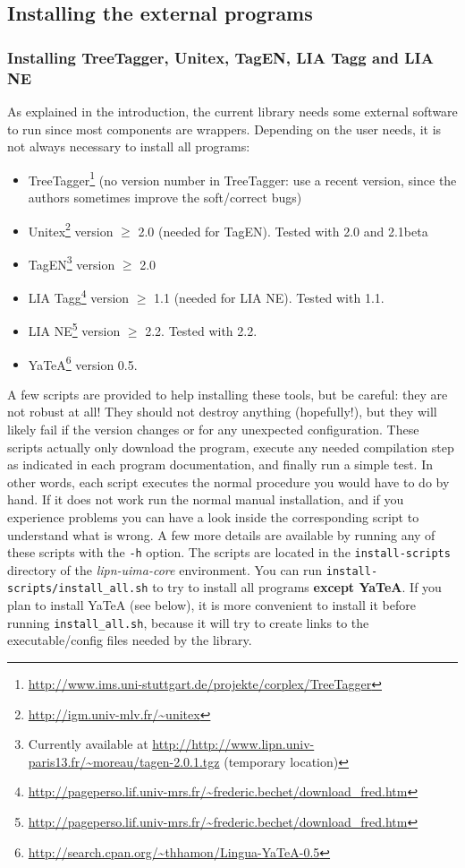 \documentclass{article}
\newenvironment{xitemize}{
\begin{itemize}
  \setlength{\itemsep}{.3\baselineskip}
  \setlength{\topsep}{0pt}
  \setlength{\parskip}{0pt}
  \setlength{\parsep}{0pt}
}{\end{itemize}}
\newcommand{\uimaModule}{{\em lipn-uima-core}\xspace}
\begin{document}
\subsection{Installing the external programs}
\label{installExternalPrograms}

\subsubsection{Installing TreeTagger, Unitex, TagEN, LIA Tagg and LIA NE}

As explained in the introduction, the current library needs some external software to run since most components are wrappers. Depending on the user needs, it is not always necessary to install all programs:

\begin{xitemize}
\item TreeTagger\footnote{\url{http://www.ims.uni-stuttgart.de/projekte/corplex/TreeTagger}} (no version number in TreeTagger: use a recent version, since the authors sometimes improve the soft/correct bugs)
\item Unitex\footnote{\url{http://igm.univ-mlv.fr/~unitex}} version $\geq$ 2.0 (needed for TagEN). Tested with 2.0 and 2.1beta
\item TagEN\footnote{Currently available at \url{http://http://www.lipn.univ-paris13.fr/~moreau/tagen-2.0.1.tgz} (temporary location)} version $\geq$ 2.0 
\item LIA Tagg\footnote{\url{http://pageperso.lif.univ-mrs.fr/~frederic.bechet/download_fred.htm}} version $\geq$ 1.1 (needed for LIA NE). Tested with 1.1.
\item LIA NE\footnote{\url{http://pageperso.lif.univ-mrs.fr/~frederic.bechet/download_fred.htm}} version $\geq$ 2.2. Tested with 2.2.
\item YaTeA\footnote{\url{http://search.cpan.org/~thhamon/Lingua-YaTeA-0.5}} version 0.5.
\end{xitemize}

A few scripts are provided to help installing these tools, but be careful: they are not robust at all! They should not destroy anything (hopefully!), but they will likely fail if the version changes or for any unexpected configuration. These scripts actually only download the program, execute any needed compilation step as indicated in each program documentation, and finally run a simple test. In other words, each script executes the normal procedure you would have to do by hand. If it does not work run the normal manual installation, and if you experience problems you can have a look inside the corresponding script to understand what is wrong. A few more details are available by running any of these scripts with the {\tt -h} option. The scripts are located in the {\tt install-scripts} directory of the \uimaModule environment. You can run {\tt install-scripts/install\_all.sh} to try to install all programs {\bf except YaTeA}. If you plan to install YaTeA (see below), it is more convenient to install it before running {\tt install\_all.sh}, because it will try to create links to the executable/config files needed by the library.
\end{document}
